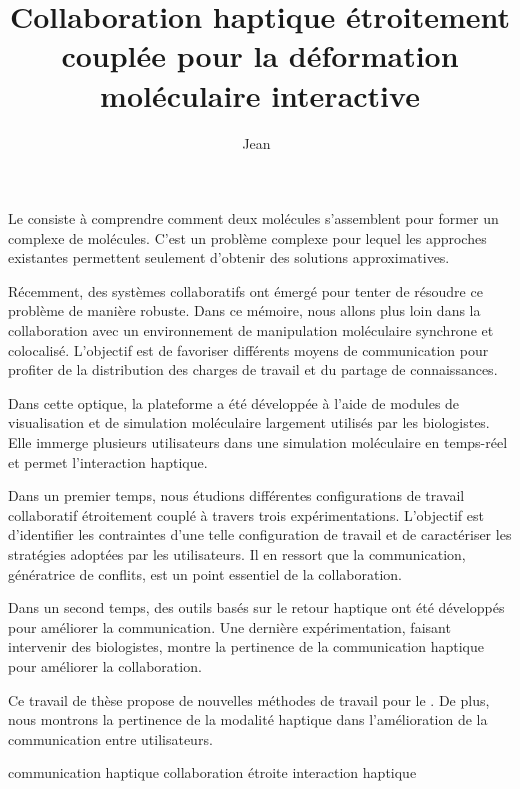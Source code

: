 \documentclass[myfrancais,ngerman,english,french]{mythesis}
\title{Collaboration haptique étroitement couplée pour la déformation moléculaire interactive}
\author{Jean~\myname{Simard}}
\date{\mydate[datestyle=long]{01/02/2012}}
\date{\myemph{<à définir>}}
\begin{document}
	\frontmatter
	\maketitle
	\mytoc
	\mylof
	\mylot
	\begin{myabstract}[french]
		Le  consiste à comprendre comment deux molécules s'assemblent pour former un complexe de molécules.
		C'est un problème complexe pour lequel les approches existantes permettent seulement d'obtenir des solutions approximatives.

		Récemment, des systèmes collaboratifs ont émergé pour tenter de résoudre ce problème de manière robuste.
		Dans ce mémoire, nous allons plus loin dans la collaboration avec un environnement de manipulation moléculaire synchrone et colocalisé.
		L'objectif est de favoriser différents moyens de communication pour profiter de la distribution des charges de travail et du partage de connaissances.

		Dans cette optique, la plateforme \myShaddock a été développée à l'aide de modules de visualisation et de simulation moléculaire largement utilisés par les biologistes.
		Elle immerge plusieurs utilisateurs dans une simulation moléculaire en temps-réel et permet l'interaction haptique.

		Dans un premier temps, nous étudions différentes configurations de travail collaboratif étroitement couplé à travers trois expérimentations.
		L'objectif est d'identifier les contraintes d'une telle configuration de travail et de caractériser les stratégies adoptées par les utilisateurs.
		Il en ressort que la communication, génératrice de conflits, est un point essentiel de la collaboration.

		Dans un second temps, des outils basés sur le retour haptique ont été développés pour améliorer la communication.
		Une dernière expérimentation, faisant intervenir des biologistes, montre la pertinence de la communication haptique pour améliorer la collaboration.

		Ce travail de thèse propose de nouvelles méthodes de travail pour le .
		De plus, nous montrons la pertinence de la modalité haptique dans l'amélioration de la communication entre utilisateurs.
		\begin{mykeywords}
			\mykeyword {}
			\mykeyword communication haptique
			\mykeyword collaboration étroite
			\mykeyword interaction haptique
		\end{mykeywords}
	\end{myabstract}
\end{document}

